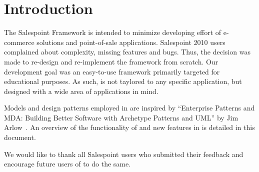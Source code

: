 \chapter{Introduction}
The Salespoint Framework is intended to minimize developing effort of e-commerce solutions and point-of-sale applications.
Salespoint 2010 users complained about complexity, missing features and bugs.
Thus, the decision was made to re-design and re-implement the framework from scratch.
Our development goal was an easy-to-use framework primarily targeted for educational purposes.
As such, \salespoint{} is not taylored to any specific application, but designed with a wide area of applications in mind.

Models and design patterns employed in \salespoint{} are inspired by ``Enterprise Patterns and MDA: Building Better Software with Archetype Patterns and UML'' by Jim Arlow~\cite{MDA}.
An overview of the functionality of and new features in \salespoint{} is detailed in this document.

We would like to thank all Salespoint users who submitted their feedback and encourage future users of \salespoint{} to do the same.
